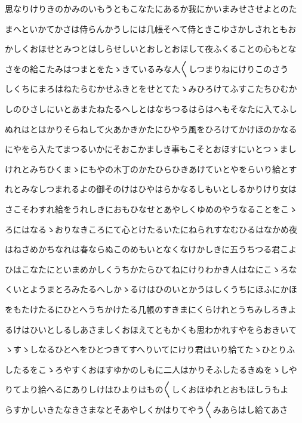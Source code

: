 \documentclass[a4paper,11pt,landscape]{ltjtarticle}
\begin{document}
\par\medskip
思なりけりきのかみのいもうともこなたにあるか我にかいまみせさせよとのた
\par\medskip
まへといかてかさは侍らんかうしには几帳そへて侍ときこゆさかしされともお
\par\medskip
かしくおほせとみつとはしらせしいとおしとおほして夜ふくることの心もとな
\par\medskip
さをの給こたみはつまとをたゝきているみな人〱しつまりねにけりこのさう
\par\medskip
しくちにまろはねたらむかせふきとをせとてたゝみひろけてふすこたちひむか
\par\medskip
しのひさしにいとあまたねたるへしとはなちつるはらはへもそなたに入てふし
\par\medskip
ぬれはとはかりそらねして火あかきかたにひやう風をひろけてかけほのかなる
\par\medskip
にやをら入たてまつるいかにそおこかましき事もこそとおほすにいとつゝまし
\par\medskip
けれとみちひくまゝにもやの木丁のかたひらひきあけていとやをらいり給とす
\par\medskip
れとみなしつまれるよの御そのけはひやはらかなるしもいとしるかりけり女は
\par\medskip
さこそわすれ給をうれしきにおもひなせとあやしくゆめのやうなることをこゝ
\par\medskip
ろにはなるゝおりなきころにて心とけたるいたにねられすなむひるはなかめ夜
\par\medskip
はねさめかちなれは春ならぬこのめもいとなくなけかしきに五うちつる君こよ
\par\medskip
ひはこなたにといまめかしくうちかたらひてねにけりわかき人はなにこゝろな
\par\medskip
くいとようまとろみたるへしかゝるけはひのいとかうはしくうちにほふにかほ
\par\medskip
をもたけたるにひとへうちかけたる几帳のすきまにくらけれとうちみしろきよ
\par\medskip
るけはひいとしるしあさましくおほえてともかくも思わかれすやをらおきいて
\par\medskip
ゝすゝしなるひとへをひとつきてすへりいてにけり君はいり給てたゝひとりふ
\par\medskip
したるをこゝろやすくおほすゆかのしもに二人はかりそふしたるきぬをゝしや
\par\medskip
りてより給へるにありしけはひよりはもの〱しくおほゆれとおもほしうもよ
\par\medskip
らすかしいきたなきさまなとそあやしくかはりてやう〱みあらはし給てあさ
\par\medskip
\end{document}

